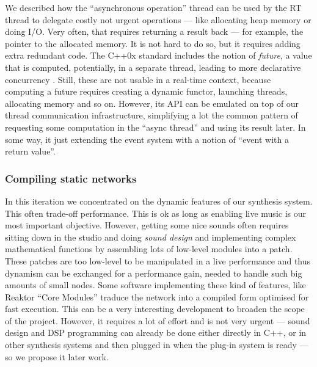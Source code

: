 We described how the ``asynchronous operation'' thread can be used by
the RT thread to delegate costly not urgent operations --- like
allocating heap memory or doing I/O. Very often, that requires
returning a result back --- for example, the pointer to the allocated
memory. It is not hard to do so, but it requires adding extra
redundant code. The C++0x standard includes the notion of
\emph{future}, a value that is computed, potentially, in a separate
thread, leading to more declarative concurrency
\cite{howard06mt}. Still, these are not usable in a real-time context,
because computing a future requires creating a dynamic functor,
launching threads, allocating memory and so on. However, its API can
be emulated on top of our thread communication infrastructure,
simplifying a lot the common pattern of requesting some computation in
the ``async thread'' and using its result later. In some way, it just
extending the event system with a notion of ``event with a return
value''.

\subsubsection{Compiling static networks}

In this iteration we concentrated on the dynamic features of our
synthesis system. This often trade-off performance. This is ok as long
as enabling live music is our most important objective. However,
getting some nice sounds often requires sitting down in the studio and
doing \emph{sound design} and implementing complex mathematical
functions by assembling lots of low-level modules into a patch. These
patches are too low-level to be manipulated in a live performance and
thus dynamism can be exchanged for a performance gain, needed to
handle such big amounts of small nodes. Some software implementing
these kind of features, like Reaktor ``Core Modules'' traduce the
network into a compiled form optimised for fast execution. This can be
a very interesting development to broaden the scope of the
project. However, it requires a lot of effort and is not very urgent
--- sound design and DSP programming can already be done either
directly in C++, or in other synthesis systems and then plugged in
when the plug-in system is ready --- so we propose it later work.

